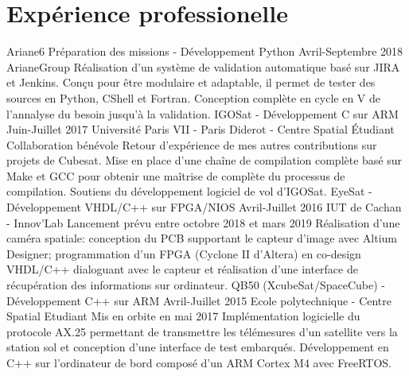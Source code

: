\documentclass[]{friggeri-cv-custom} %
\begin{document}
\section{Expérience professionelle}
\begin{entrylist}
\entry
{Ariane6 Préparation des missions - Développement Python}
{Avril-Septembre 2018}
{ArianeGroup}
{}
{
  Réalisation d'un système de validation automatique basé sur JIRA et Jenkins.
  Conçu pour être modulaire et adaptable, il permet de tester des sources
  en Python, CShell et Fortran.
  Conception complète en cycle en V de l'annalyse du besoin
  jusqu'à la validation.
}
\entry
{IGOSat - Développement C sur ARM}
{Juin-Juillet 2017}
{Université Paris VII - Paris Diderot - Centre Spatial Étudiant}
{Collaboration bénévole}
{
  Retour d'expérience de mes autres contributions sur projets de Cubesat.
  Mise en place d'une chaîne de compilation complète basé sur Make et GCC pour
  obtenir une maîtrise de complète du processus
  de compilation. Soutiens du développement logiciel de vol d'IGOSat.%
}
\entry
{EyeSat - Développement VHDL/C++ sur FPGA/NIOS}
{Avril-Juillet 2016}
{IUT de Cachan - Innov'Lab}
{Lancement prévu entre octobre 2018 et mars 2019}
{
  Réalisation d'une caméra spatiale: conception du PCB supportant le capteur
  d'image avec Altium Designer; programmation d'un FPGA (Cyclone II d'Altera)
  en co-design VHDL/C++ dialoguant avec le capteur et réalisation
  d'une interface de récupération des informations sur ordinateur.
}
\entry
{QB50 (XcubeSat/SpaceCube) - Développement C++ sur ARM}
{Avril-Juillet 2015}
{Ecole polytechnique - Centre Spatial Etudiant}
{Mis en orbite en mai 2017}
{
  Implémentation logicielle du protocole AX.25 permettant de transmettre les
  télémesures d'un satellite vers la station sol et conception d'une interface
  de test embarqués. Développement en C++ sur l'ordinateur de bord composé d'un
  ARM Cortex M4 avec FreeRTOS.
}
\end{entrylist}%
\end{document}
